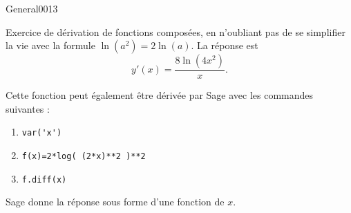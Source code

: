 \begin{corrige}{General0013}

Exercice de dérivation de fonctions composées, en n'oubliant pas de se simplifier la vie avec la formule $\ln(a^2)=2\ln(a)$. La réponse est
\begin{equation}
	y'(x)=\frac{ 8\ln(4x^2) }{ x }.
\end{equation}

Cette fonction peut également être dérivée par Sage avec les commandes suivantes :
\begin{enumerate}

	\item
		\verb+var('x')+
	\item
		\verb+f(x)=2*log( (2*x)**2 )**2+
	\item
		\verb+f.diff(x)+

\end{enumerate}
Sage donne la réponse sous forme d'une fonction de $x$.

\end{corrige}
